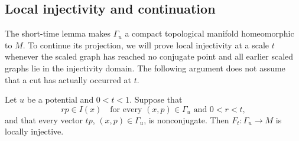 \subsection{Local injectivity and continuation}

The short-time lemma makes $\Gamma_u$ a compact topological manifold
homeomorphic to $M$. To continue its projection, we will prove local
injectivity at a scale $t$ whenever the scaled graph has reached no
conjugate point and all earlier scaled graphs lie in the injectivity
domain. The following argument does not assume that a cut has actually
occurred at $t$.

\begin{lemma}
\label{geo:local-injectivity}
Let $u$ be a potential and $0<t<1$. Suppose that
\[
 rp\in I(x)\quad\text{for every }(x,p)\in\Gamma_u
               \text{ and }0<r<t,
\]
and that every vector $tp$, $(x,p)\in\Gamma_u$, is nonconjugate.
Then $F_t:\Gamma_u\to M$ is locally injective.
\end{lemma}

